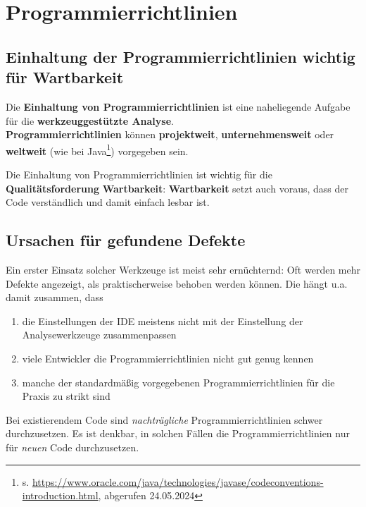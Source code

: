 \section{Programmierrichtlinien}\label{sec:programmierrichtlinien}

\subsection*{Einhaltung der Programmierrichtlinien wichtig für Wartbarkeit}

Die \textbf{Einhaltung von Programmierrichtlinien} ist eine naheliegende Aufgabe für die \textbf{werkzeuggestützte Analyse}.\\
\textbf{Programmierrichtlinien} können \textbf{projektweit}, \textbf{unternehmensweit} oder \textbf{weltweit} (wie bei Java\footnote{
s. \url{https://www.oracle.com/java/technologies/javase/codeconventions-introduction.html}, abgerufen 24.05.2024
}) vorgegeben sein.\\

\begin{tcolorbox}
Die Einhaltung von Programmierrichtlinien ist wichtig für die \textbf{Qualitätsforderung} \textbf{Wartbarkeit}: \textbf{Wartbarkeit} setzt auch voraus, dass der Code verständlich und damit einfach lesbar ist.
\end{tcolorbox}
\vspace{2mm}

\subsection*{Ursachen für gefundene Defekte}
Ein erster Einsatz solcher Werkzeuge ist meist sehr ernüchternd: Oft werden mehr Defekte angezeigt, als praktischerweise behoben werden können.
Die hängt u.a. damit zusammen, dass

\begin{enumerate}
    \item die Einstellungen der IDE meistens nicht mit der Einstellung der Analysewerkzeuge zusammenpassen
    \item viele Entwickler die Programmierrichtlinien nicht gut genug kennen
    \item manche der standardmäßig vorgegebenen Programmierrichtlinien für die Praxis zu strikt sind
\end{enumerate}

\noindent
Bei existierendem Code sind \textit{nachträgliche} Programmierrichtlinien schwer durchzusetzen.
Es ist denkbar, in solchen Fällen die Programmierrichtlinien nur für \textit{neuen} Code durchzusetzen.

